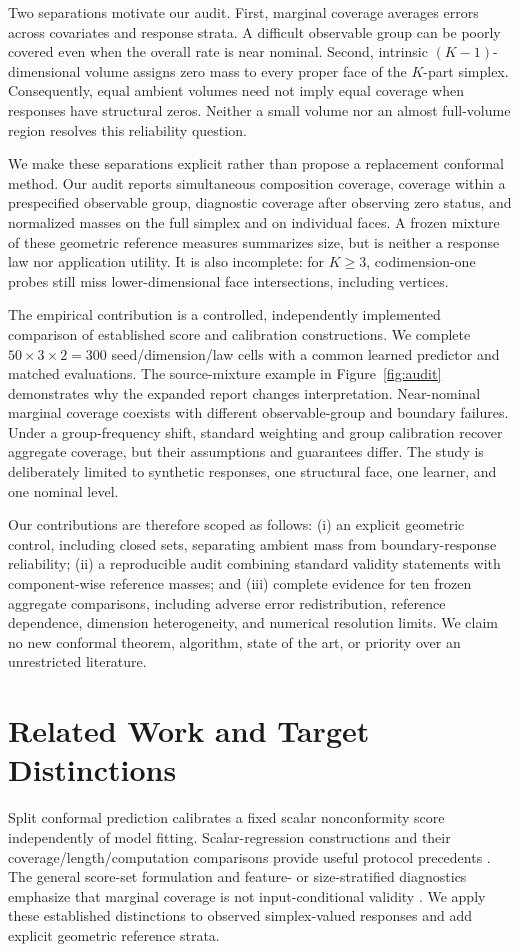 \documentclass{article}
\theoremstyle{plain}
\begin{document}
Two separations motivate our audit. First, marginal coverage averages errors across covariates and response strata. A difficult observable group can be poorly covered even when the overall rate is near nominal. Second, intrinsic $(K-1)$-dimensional volume assigns zero mass to every proper face of the $K$-part simplex. Consequently, equal ambient volumes need not imply equal coverage when responses have structural zeros. Neither a small volume nor an almost full-volume region resolves this reliability question.

We make these separations explicit rather than propose a replacement conformal method. Our audit reports simultaneous composition coverage, coverage within a prespecified observable group, diagnostic coverage after observing zero status, and normalized masses on the full simplex and on individual faces. A frozen mixture of these geometric reference measures summarizes size, but is neither a response law nor application utility. It is also incomplete: for $K\geq3$, codimension-one probes still miss lower-dimensional face intersections, including vertices.

The empirical contribution is a controlled, independently implemented comparison of established score and calibration constructions. We complete $50\times3\times2=300$ seed/dimension/law cells with a common learned predictor and matched evaluations. The source-mixture example in Figure~\ref{fig:audit} demonstrates why the expanded report changes interpretation. Near-nominal marginal coverage coexists with different observable-group and boundary failures. Under a group-frequency shift, standard weighting and group calibration recover aggregate coverage, but their assumptions and guarantees differ. The study is deliberately limited to synthetic responses, one structural face, one learner, and one nominal level.

Our contributions are therefore scoped as follows: (i) an explicit geometric control, including closed sets, separating ambient mass from boundary-response reliability; (ii) a reproducible audit combining standard validity statements with component-wise reference masses; and (iii) complete evidence for ten frozen aggregate comparisons, including adverse error redistribution, reference dependence, dimension heterogeneity, and numerical resolution limits. We claim no new conformal theorem, algorithm, state of the art, or priority over an unrestricted literature.

\section{Related Work and Target Distinctions}
\label{sec:related}
Split conformal prediction calibrates a fixed scalar nonconformity score independently of model fitting. Scalar-regression constructions and their coverage/length/computation comparisons provide useful protocol precedents \citep{lei2016distributionfree}. The general score-set formulation and feature- or size-stratified diagnostics emphasize that marginal coverage is not input-conditional validity \citep{angelopoulos2021gentle}. We apply these established distinctions to observed simplex-valued responses and add explicit geometric reference strata.
\end{document}

